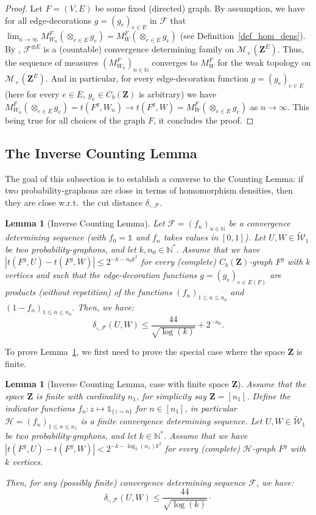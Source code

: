 \documentclass{amsart}
\newcommand{\wrt}{w.r.t.\ }
\theoremstyle{plain}
\newtheorem{lemme}[Th]{Lemma}
\theoremstyle{definition}
\newcommand{\Space}{\mathbf{Z}}
\newcommand{\cH}{\mathcal{H}}
\newcommand{\MeasX}[1]{\mathcal{M}_+(#1)}
\newcommand{\CbFunct}{C_b(\Space)}
\newcommand{\UGraphon}{\widetilde{\mathcal{W}}_1}
\newcommand{\ddcutF}{\delta_{\square,\mathcal{F}}}
\newcommand{\F}{\mathcal{F}}
\newcommand{\ind}{\mathds{1}}
\newcommand{\un}{\mathds{1}}
\newcommand{\N}{\mathbb{N}}
\begin{document}
\begin{proof}
Let $F=(V,E)$ be some fixed (directed) graph.
By assumption, we have for all edge-decorations $g=(g_e)_{e\in E}$ in $\F$ that
$\lim_{n\to\infty} M_{W_n}^F(\otimes_{e\in E} g_e)
	= M_W^F(\otimes_{e\in E} g_e)$
	(see Definition~\ref{def_hom_dens}).
By \cite[Chapter 3, Proposition 4.6]{Ethier},
$\F^{\otimes E}$ is a (countable) convergence determining family on $\MeasX{\Space^E}$.
Thus, the sequence of measures $(M_{W_n}^F)_{n\in\N}$
converges to $M_W^F$
for the weak topology on $\MeasX{\Space^E}$.
And in particular, for every edge-decoration function 
	$g = (g_e)_{e\in E}$
(here for every $e\in E$, $g_e\in \CbFunct$ is arbitrary)
we have $M_{W_n}^F(\otimes_{e\in E} g_e) = t(F^g,W_n) \to t(F^g,W) = M_W^F(\otimes_{e\in E} g_e)$ as $n\to\infty$.
This being true for all choices of the graph $F$,
it concludes the proof.
\end{proof}



\subsection{The Inverse Counting Lemma}

The goal of this subsection is to establish a converse  to the Counting Lemma:
if two probability-graphons are close in terms of homomorphism densities,
then they are close \wrt the cut distance $\ddcutF$.

\begin{lemme}[Inverse Counting Lemma]
	\label{InverseCountingLemma}
Let $\F= (f_n)_{n\in \N}$ be a convergence determining sequence
	(with $f_0 = \un$ and $f_n$  takes values  in  $[0,1]$).
Let $U,W \in \UGraphon$ be two probability-graphons, and let $k, n_0\in \N^*$.
Assume that we have $| t(F^g,U) - t(F^g,W) | \leq 2^{-k - n_0 k^2}$
for every (complete) $\CbFunct$-graph $F^g$ with $k$  vertices 
and such that the edge-decoration functions $g=(g_e)_{e\in E(F)}$
are  products (without repetition)
	of the functions $(f_n)_{1\leq n\leq n_0}$ and $(1-f_n)_{1\leq n\leq n_0}$.
Then, we have:
\[ \ddcutF(U,W) \leq \frac{44}{\sqrt{\log(k)}} + 2^{-n_0}    . \]
\end{lemme}


To prove Lemma~\ref{InverseCountingLemma}, we first need to prove
	the special case where the space $\Space$ is finite.


\begin{lemme}[Inverse Counting Lemma, case with finite space $\Space$]
	\label{InverseCountingLemmaWithFiniteSpace}
Assume that the space $\Space$ is finite with cardinality $n_1$,
	for simplicity say $\Space = [n_1]$.
Define the indicator functions $f_n : z\mapsto \ind_{\{z = n\}}$ for $n\in [n_1]$,
	in particular $\cH= (f_n)_{1\leq n \leq n_1}$ is a finite convergence determining sequence.
Let $U,W \in \UGraphon$ be two probability-graphons, and let $k\in \N^*$.
Assume that we have $| t(F^g,U) - t(F^g,W) | < 2^{-k - \log_2(n_1) k^2}$
for every (complete) $\cH$-graph $F^g$ with $k$  vertices.

Then, for any (possibly finite) convergence determining sequence $\F$, we have:
\[ \ddcutF(U,W) \leq \frac{44}{\sqrt{\log(k)}}  \cdot \]
\end{lemme}
\end{document}
